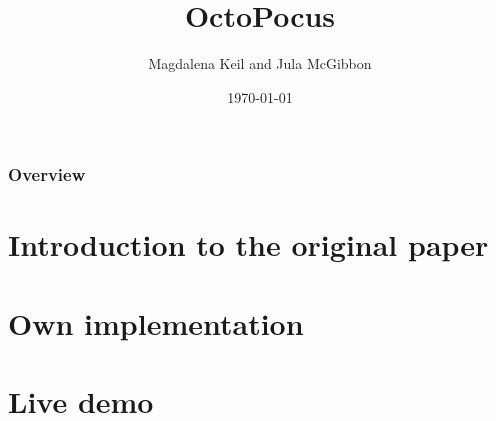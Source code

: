 \documentclass{beamer}
\title[MIS Project]{OctoPocus} %
\author{Magdalena Keil and Jula McGibbon} %
\institute[BUW] %
{
Bauhaus Universität Weimar  %
}
\date{\today} %
\begin{document}
\begin{frame}
\titlepage %
\end{frame}

\begin{frame}
\frametitle{Overview} %
\tableofcontents %
\end{frame}

\section{Introduction to the original paper} 

\section{Own implementation}

\section{Live demo}

\end{document}

